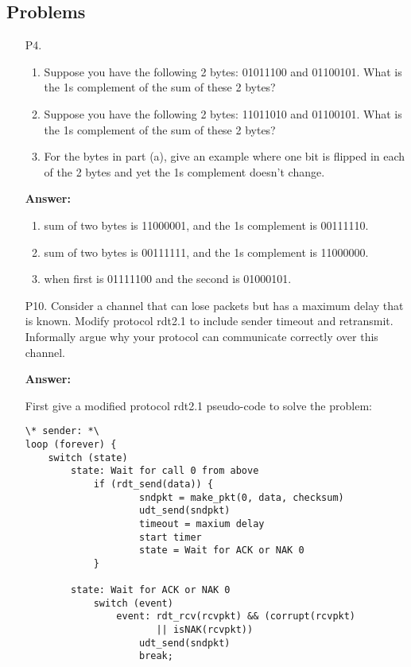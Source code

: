 \subsection{Problems}

\begin{enumerate}
    \item[P4.]
    \begin{enumerate}
        \item Suppose you have the following 2 bytes: 01011100 and 01100101. What is the 1s complement of the sum of these 2 bytes?
        \item Suppose you have the following 2 bytes: 11011010 and 01100101. What is the 1s complement of the sum of these 2 bytes?
        \item For the bytes in part (a), give an example where one bit is flipped in each of the 2 bytes and yet the 1s complement doesn’t change.
    \end{enumerate}

    \textbf{Answer: }

    \begin{enumerate}
        \item sum of two bytes is 11000001, and the 1s complement is 00111110.
        \item sum of two bytes is 00111111, and the 1s complement is 11000000.
        \item when first is 01111100 and the second is 01000101.
    \end{enumerate}
    
    \item[P10.] Consider a channel that can lose packets but has a maximum delay that is known. Modify protocol rdt2.1 to include sender timeout and retransmit. Informally argue why your protocol can communicate correctly over this channel.

    \textbf{Answer:}

    First give a modified protocol rdt2.1 pseudo-code to solve the problem:
    \begin{lstlisting}
\* sender: *\
loop (forever) {
    switch (state)
        state: Wait for call 0 from above
            if (rdt_send(data)) {
                    sndpkt = make_pkt(0, data, checksum)
                    udt_send(sndpkt)
                    timeout = maxium delay
                    start timer
                    state = Wait for ACK or NAK 0
            }

        state: Wait for ACK or NAK 0
            switch (event)
                event: rdt_rcv(rcvpkt) && (corrupt(rcvpkt)
                       || isNAK(rcvpkt))
                    udt_send(sndpkt)
                    break;


\end{lstlisting}
\end{enumerate}
